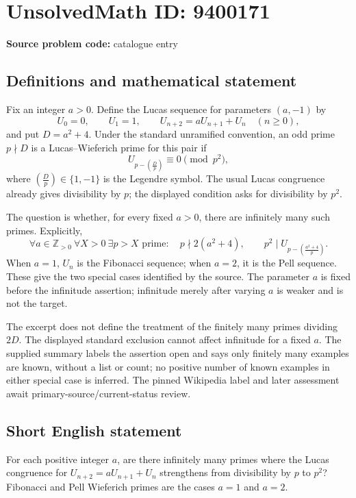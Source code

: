 \documentclass[11pt]{article}
\begin{document}
\section*{UnsolvedMath ID: 9400171}
\textbf{Source problem code:} catalogue entry
\subsection{Definitions and mathematical statement}
Fix an integer \(a>0\). Define the Lucas sequence for parameters \((a,-1)\) by
\[
 U_0=0,\qquad U_1=1,\qquad U_{n+2}=aU_{n+1}+U_n\quad(n\ge0),
\]
and put \(D=a^2+4\). Under the standard unramified convention, an odd prime \(p\nmid D\) is a Lucas--Wieferich prime for this pair if
\[
 U_{p-\left(\frac Dp\right)}\equiv0\pmod{p^2},
\]
where \(\left(\frac Dp\right)\in\{1,-1\}\) is the Legendre symbol. The usual Lucas congruence already gives divisibility by \(p\); the displayed condition asks for divisibility by \(p^2\).

The question is whether, for every fixed \(a>0\), there are infinitely many such primes. Explicitly,
\[
 \forall a\in\mathbb Z_{>0}\ \forall X>0\ \exists p>X\text{ prime}:\quad
 p\nmid2(a^2+4),\qquad
 p^2\mid U_{p-\left(\frac{a^2+4}{p}\right)}.
\]
When \(a=1\), \(U_n\) is the Fibonacci sequence; when \(a=2\), it is the Pell sequence. These give the two special cases identified by the source. The parameter \(a\) is fixed before the infinitude assertion; infinitude merely after varying \(a\) is weaker and is not the target.

The excerpt does not define the treatment of the finitely many primes dividing \(2D\). The displayed standard exclusion cannot affect infinitude for a fixed \(a\). The supplied summary labels the assertion open and says only finitely many examples are known, without a list or count; no positive number of known examples in either special case is inferred. The pinned Wikipedia label and later assessment await primary-source/current-status review.
\subsection{Short English statement}
For each positive integer \(a\), are there infinitely many primes where the Lucas congruence for \(U_{n+2}=aU_{n+1}+U_n\) strengthens from divisibility by \(p\) to \(p^2\)? Fibonacci and Pell Wieferich primes are the cases \(a=1\) and \(a=2\).
\end{document}
